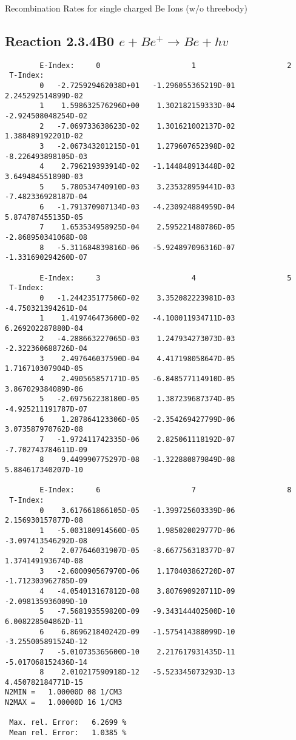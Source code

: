 \documentclass[12pt,dvipdfmx]{article}
\begin{document}
  Recombination Rates for single charged Be Ions (w/o threebody)

\subsection{
Reaction 2.3.4B0  $e + Be^+ \rightarrow Be + hv$
}


\begin{small}\begin{verbatim}
        E-Index:     0                     1                     2
 T-Index:
        0   -2.725929462038D+01   -1.296055365219D-01    2.245292514899D-02
        1    1.598632576296D+00    1.302182159333D-04   -2.924508048254D-02
        2   -7.069733638623D-02    1.301621002137D-02    1.388489192201D-02
        3   -2.067343201215D-01    1.279607652398D-02   -8.226493898105D-03
        4    2.796219393914D-02   -1.144848913448D-02    3.649484551890D-03
        5    5.780534740910D-03    3.235328959441D-03   -7.482336928187D-04
        6   -1.791370907134D-03   -4.230924884959D-04    5.874787455135D-05
        7    1.653534958925D-04    2.595221480786D-05   -2.868950341068D-08
        8   -5.311684839816D-06   -5.924897096316D-07   -1.331690294260D-07

        E-Index:     3                     4                     5
 T-Index:
        0   -1.244235177506D-02    3.352082223981D-03   -4.750321394261D-04
        1    1.419746473600D-02   -4.100011934711D-03    6.269202287880D-04
        2   -4.288663227065D-03    1.247934273073D-03   -2.322360688726D-04
        3    2.497646037590D-04    4.417198058647D-05    1.716710307904D-05
        4    2.490565857171D-05   -6.848577114910D-05    3.867029384089D-06
        5   -2.697562238180D-05    1.387239687374D-05   -4.925211191787D-07
        6    1.287864123306D-05   -2.354269427799D-06    3.073587970762D-08
        7   -1.972411742335D-06    2.825061118192D-07   -7.702743784611D-09
        8    9.449990775297D-08   -1.322880879849D-08    5.884617340207D-10

        E-Index:     6                     7                     8
 T-Index:
        0    3.617661866105D-05   -1.399725603339D-06    2.156930157877D-08
        1   -5.003180914560D-05    1.985020029777D-06   -3.097413546292D-08
        2    2.077646031907D-05   -8.667756318377D-07    1.374149193674D-08
        3   -2.600090567970D-06    1.170403862720D-07   -1.712303962785D-09
        4   -4.054013167812D-08    3.807690920711D-09   -2.098135936009D-10
        5   -7.568193559820D-09   -9.343144402500D-10    6.008228504862D-11
        6    6.869621840242D-09   -1.575414388099D-10   -3.255005891524D-12
        7   -5.010735365600D-10    2.217617931435D-11   -5.017068152436D-14
        8    2.010217590918D-12   -5.523345073293D-13    4.450782184771D-15
N2MIN =   1.00000D 08 1/CM3
N2MAX =   1.00000D 16 1/CM3

 Max. rel. Error:   6.2699 %
 Mean rel. Error:   1.0385 %

\end{verbatim}\end{small}
\end{document}
